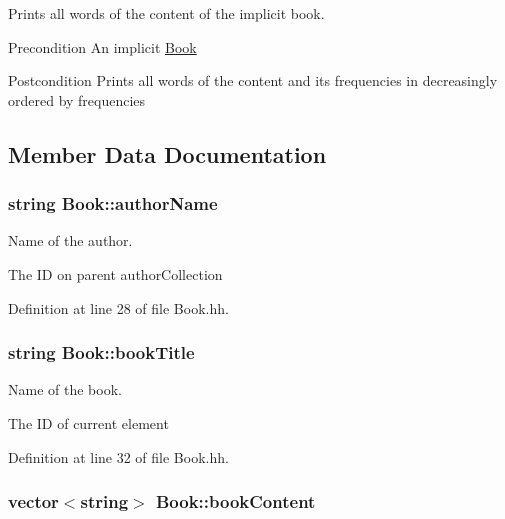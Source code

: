 Prints all words of the content of the implicit book. 

\begin{DoxyPrecond}{Precondition}
An implicit \hyperlink{class_book}{Book} 
\end{DoxyPrecond}
\begin{DoxyPostcond}{Postcondition}
Prints all words of the content and its frequencies in decreasingly ordered by frequencies 
\end{DoxyPostcond}


\subsection{Member Data Documentation}
\hypertarget{class_book_a0dcb8f78ffb56c34e28f5d672b422e2a}{
\subsubsection[{author\-Name}]{\setlength{\rightskip}{0pt plus 5cm}string Book\-::author\-Name\hspace{0.3cm}{\ttfamily [private]}}}\label{class_book_a0dcb8f78ffb56c34e28f5d672b422e2a}


Name of the author. 

The I\-D on parent author\-Collection 

Definition at line 28 of file Book.\-hh.

\hypertarget{class_book_a111d7b30bddd6166bd09764f050cfee3}{
\subsubsection[{book\-Title}]{\setlength{\rightskip}{0pt plus 5cm}string Book\-::book\-Title\hspace{0.3cm}{\ttfamily [private]}}}\label{class_book_a111d7b30bddd6166bd09764f050cfee3}


Name of the book. 

The I\-D of current element 

Definition at line 32 of file Book.\-hh.

\hypertarget{class_book_a62ca3f4431b699fa41384c8bab7ef4fa}{
\subsubsection[{book\-Content}]{\setlength{\rightskip}{0pt plus 5cm}vector$<$string$>$ Book\-::book\-Content\hspace{0.3cm}{\ttfamily [private]}}}\label{class_book_a62ca3f4431b699fa41384c8bab7ef4fa}


